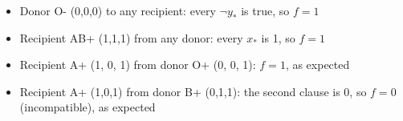 \documentclass{article}
\begin{document}
\begin{itemize}
    \item  Donor O- (0,0,0) to any recipient: every $\neg y_{*}$ is true, so $f = 1$ 
    \item  Recipient AB+ (1,1,1) from any donor: every $x_{*}$  is 1, so $f = 1$
    \item  Recipient A+ (1, 0, 1) from donor O+ (0, 0, 1): $f = 1$, as expected 
    \item  Recipient A+ (1,0,1) from donor B+ (0,1,1): the second clause is 0, so $f = 0$ (incompatible), as expected
\end{itemize}



%




\printbibliography
\end{document}
